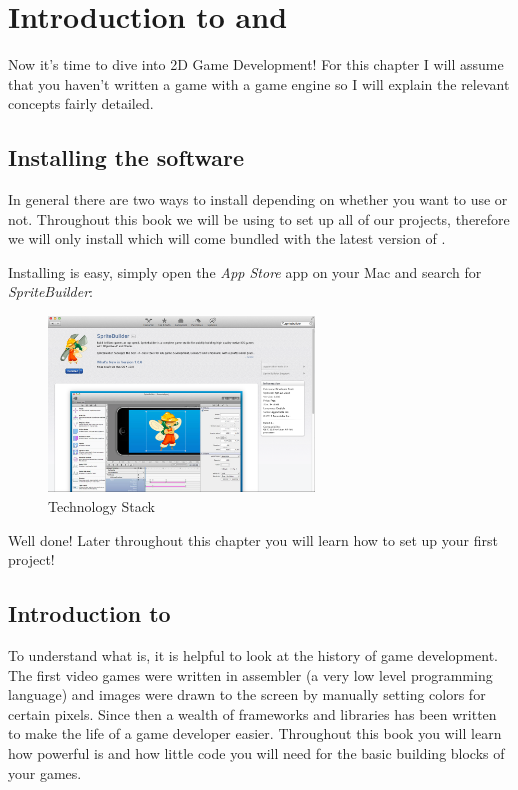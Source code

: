 \chapter{Introduction to \SB{} and \cocos{} }
Now it's time to dive into 2D Game Development! For this chapter I will assume
that you haven't written a game with a game engine so I will explain the
relevant concepts fairly detailed.

\section{Installing the software}
In general there are two ways to install \cocos{} depending on whether you want
to use \SB{} or not. Throughout this book we will be using \SB{} to set up all
of our projects, therefore we will only install \SB{} which will come bundled
with the latest version of \cocos{}. 

Installing \SB{} is easy, simply open the \textit{App Store} app on your Mac and
search for \textit{SpriteBuilder}:

\begin{figure}[H]
		\centering
		\includegraphics[width=200pt]{images/cocos2d/setup/mac_appstore_install.png}     
		\caption{\cocos{} Technology Stack}
\end{figure}

Well done! Later throughout this chapter you will learn how to set up your first
project!

\section{Introduction to \cocos{}}
To understand what \cocos{} is, it is helpful to look at the history of game
development. The first video games were written in assembler (a very low level
programming language) and images were drawn to the screen by manually setting
colors for certain pixels. Since then a wealth of frameworks and libraries has been written to make the life of a game
developer easier. Throughout this book you will learn how powerful \cocos{} is
and how little code you will need for the basic building blocks of your games.

